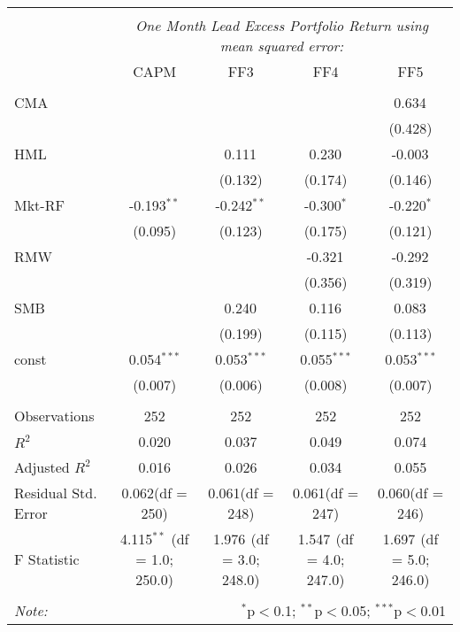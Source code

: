 \begin{table}[!htbp] \centering
\begin{tabular}{@{\extracolsep{5pt}}lcccc}
\\[-1.8ex]\hline
\hline \\[-1.8ex]
& \multicolumn{4}{c}{\textit{One Month Lead Excess Portfolio Return using mean squared error:}} \
\cr \cline{4-5}
\\[-1.8ex] & CAPM & FF3 & FF4 & FF5 \\
\hline \\[-1.8ex]
 CMA & & & & 0.634$^{}$ \\
  & & & & (0.428) \\
 HML & & 0.111$^{}$ & 0.230$^{}$ & -0.003$^{}$ \\
  & & (0.132) & (0.174) & (0.146) \\
 Mkt-RF & -0.193$^{**}$ & -0.242$^{**}$ & -0.300$^{*}$ & -0.220$^{*}$ \\
  & (0.095) & (0.123) & (0.175) & (0.121) \\
 RMW & & & -0.321$^{}$ & -0.292$^{}$ \\
  & & & (0.356) & (0.319) \\
 SMB & & 0.240$^{}$ & 0.116$^{}$ & 0.083$^{}$ \\
  & & (0.199) & (0.115) & (0.113) \\
 const & 0.054$^{***}$ & 0.053$^{***}$ & 0.055$^{***}$ & 0.053$^{***}$ \\
  & (0.007) & (0.006) & (0.008) & (0.007) \\
\hline \\[-1.8ex]
 Observations & 252 & 252 & 252 & 252 \\
 $R^2$ & 0.020 & 0.037 & 0.049 & 0.074 \\
 Adjusted $R^2$ & 0.016 & 0.026 & 0.034 & 0.055 \\
 Residual Std. Error & 0.062(df = 250) & 0.061(df = 248) & 0.061(df = 247) & 0.060(df = 246)  \\
 F Statistic & 4.115$^{**}$ (df = 1.0; 250.0) & 1.976$^{}$ (df = 3.0; 248.0) & 1.547$^{}$ (df = 4.0; 247.0) & 1.697$^{}$ (df = 5.0; 246.0) \\
\hline
\hline \\[-1.8ex]
\textit{Note:} & \multicolumn{4}{r}{$^{*}$p$<$0.1; $^{**}$p$<$0.05; $^{***}$p$<$0.01} \\
\end{tabular}
\end{table}
